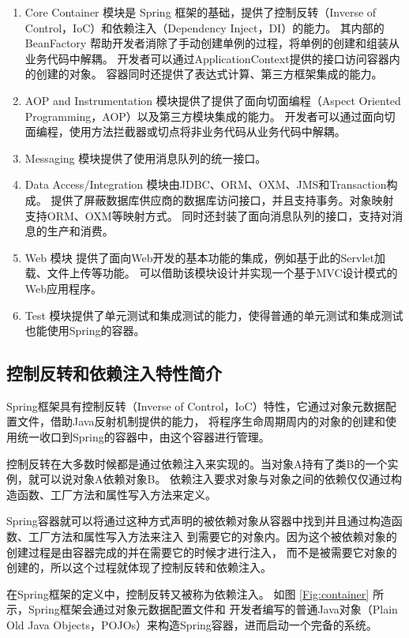 \begin{enumerate}
    \item Core Container 模块是 Spring 框架的基础，提供了控制反转（Inverse of Control，IoC）和依赖注入（Dependency Inject，DI）的能力\cite{王鹏2020精神分裂症多维度信息管理系统的设计与实现}。
    其内部的 BeanFactory 帮助开发者消除了手动创建单例的过程，将单例的创建和组装从业务代码中解耦。
    开发者可以通过ApplicationContext提供的接口访问容器内的创建的对象。
    容器同时还提供了表达式计算、第三方框架集成的能力。
    \item AOP and Instrumentation 模块提供了提供了面向切面编程（Aspect Oriented Programming，AOP）以及第三方模块集成的能力。
    开发者可以通过面向切面编程，使用方法拦截器或切点将非业务代码从业务代码中解耦。
    \item Messaging 模块提供了使用消息队列的统一接口。
    \item Data Access/Integration 模块由JDBC、ORM、OXM、JMS和Transaction构成\cite{JavaWeb开发技术与实践}。
    提供了屏蔽数据库供应商的数据库访问接口，并且支持事务。对象映射支持ORM、OXM等映射方式。
    同时还封装了面向消息队列的接口，支持对消息的生产和消费。
    \item Web 模块 提供了面向Web开发的基本功能的集成，例如基于此的Servlet加载、文件上传等功能。
    可以借助该模块设计并实现一个基于MVC设计模式的Web应用程序。
    \item Test 模块提供了单元测试和集成测试的能力，使得普通的单元测试和集成测试也能使用Spring的容器。
\end{enumerate}

\subsection{控制反转和依赖注入特性简介}
Spring框架具有控制反转（Inverse of Control，IoC）特性，它通过对象元数据配置文件，借助Java反射机制提供的能力，
将程序生命周期周内的对象的创建和使用统一收口到Spring的容器中，由这个容器进行管理。

控制反转在大多数时候都是通过依赖注入来实现的。当对象A持有了类B的一个实例，就可以说对象A依赖对象B。
依赖注入要求对象与对象之间的依赖仅仅通过构造函数、工厂方法和属性写入方法来定义。

Spring容器就可以将通过这种方式声明的被依赖对象从容器中找到并且通过构造函数、工厂方法和属性写入方法来注入
到需要它的对象内。因为这个被依赖对象的创建过程是由容器完成的并在需要它的时候才进行注入，
而不是被需要它对象的创建的，所以这个过程就体现了控制反转和依赖注入。

在Spring框架的定义中，控制反转又被称为依赖注入。
如图 \ref{Fig:container} 所示，Spring框架会通过对象元数据配置文件和
开发者编写的普通Java对象（Plain Old Java Objects，POJOs）来构造Spring容器，进而启动一个完备的系统。

